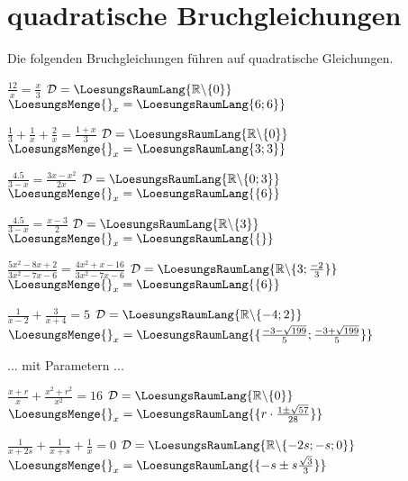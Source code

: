 \platzFuerBerechnungenBisEndeSeite{}

\section{quadratische Bruchgleichungen}
Die folgenden Bruchgleichungen führen auf quadratische Gleichungen.


\begin{bbwAufgabenBlock}
\item $\frac{12}x = \frac{x}3$ \hspace{10mm}   $\mathcal{D}= \LoesungsRaumLang{\mathbb{R}\backslash\{0\}}$  $\LoesungsMenge{}_x = \LoesungsRaumLang{\-6; 6\}}$
\item $\frac13 + \frac1x + \frac2x = \frac{1+x}3$ \hspace{10mm}   $\mathcal{D}= \LoesungsRaumLang{\mathbb{R}\backslash\{0\}}$  $\LoesungsMenge{}_x = \LoesungsRaumLang{\-3; 3\}}$
\item $\frac{4.5}{3-x} = \frac{3x-x^2}{2x}$ \hspace{10mm}   $\mathcal{D}= \LoesungsRaumLang{\mathbb{R}\backslash\{0;3\}}$  $\LoesungsMenge{}_x = \LoesungsRaumLang{\{6\}}$\noTRAINER{\newpage}
\item $\frac{4.5}{3-x} = \frac{x-3}{2}$ \hspace{10mm}   $\mathcal{D}= \LoesungsRaumLang{\mathbb{R}\backslash\{3\}}$  $\LoesungsMenge{}_x = \LoesungsRaumLang{\{\}}$
\item $\frac{5x^2-8x+2}{3x^2-7x-6}=\frac{4x^2+x-16}{3x^2-7x-6}$ \hspace{10mm}   $\mathcal{D}= \LoesungsRaumLang{\mathbb{R}\backslash\{3;\frac{-2}3\}}$  $\LoesungsMenge{}_x = \LoesungsRaumLang{\{6\}}$
\item $\frac1{x-2} + \frac3{x+4} = 5$ \hspace{10mm}         $\mathcal{D}= \LoesungsRaumLang{\mathbb{R}\backslash\{-4;2\}}$          $\LoesungsMenge{}_x = \LoesungsRaumLang{\{\frac{-3-\sqrt{199}}{5};\frac{-3+\sqrt{199}}{5} \}}$

\end{bbwAufgabenBlock}

\platzFuerBerechnungenBisEndeSeite{}



... mit Parametern ...


\begin{bbwAufgabenBlock}
\item $\frac{x+r}x + \frac{x^2+r^2}{x^2} = 16$ \hspace{10mm}         $\mathcal{D}= \LoesungsRaumLang{\mathbb{R}\backslash\{0\}}$          $\LoesungsMenge{}_x = \LoesungsRaumLang{\{r\cdot{}\frac{1\pm\sqrt{57}}{28} \}}$
\item $\frac1{x+2s}+ \frac1{x+s} + \frac1{x}=0$ \hspace{10mm}
$\mathcal{D}= \LoesungsRaumLang{\mathbb{R}\backslash\{-2s;-s;0\}}$
$\LoesungsMenge{}_x = \LoesungsRaumLang{\{-s\pm s\frac{\sqrt{3}}{3} \}}$

\end{bbwAufgabenBlock}

